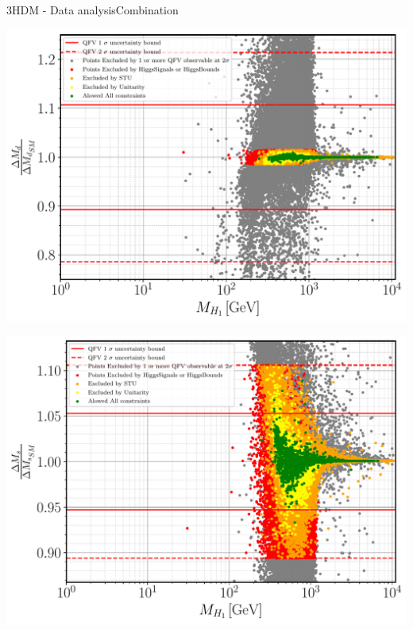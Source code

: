 \documentclass[10pt,xcolor=dvipsnames,mathserif]{beamer}
\begin{document}
\begin{frame}{3HDM - Data analysis}{Combination}
\begin{minipage}[t]{.32\textwidth}
	\end{minipage}
	\begin{minipage}[t]{.32\textwidth}
	\centering
	\includegraphics[width=\textwidth]{Images/3HDM/PT_Folder/Delta_Md_H1.pdf}
	\end{minipage}
	\begin{minipage}[t]{.32\textwidth}
	\centering
	\includegraphics[width=\textwidth]{Images/3HDM/PT_Folder/Delta_Ms_H1.pdf}
	\end{minipage}
	\begin{minipage}[t]{.32\textwidth}
	\centering

\end{minipage}
\end{frame}
\end{document}
